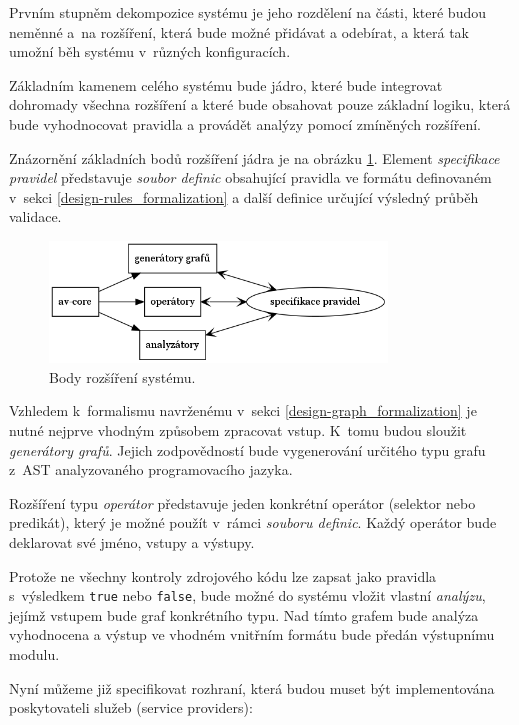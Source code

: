 Prvním stupněm dekompozice systému je jeho rozdělení na části, které budou neměnné a~na rozšíření, která bude možné přidávat a odebírat, a která tak umožní běh systému v~různých konfiguracích.

Základním kamenem celého systému bude jádro, které bude integrovat dohromady všechna rozšíření a které bude obsahovat pouze základní logiku, která bude vyhodnocovat pravidla a provádět analýzy pomocí zmíněných rozšíření.

Znázornění základních bodů rozšíření jádra je na obrázku \ref{design-system_extensions}. Element \emph{specifikace pravidel} představuje \emph{soubor definic} obsahující pravidla ve formátu definovaném v~sekci \ref{design-rules_formalization} a další definice určující výsledný průběh validace.

\begin{figure}[h!]
  \centering
  \includegraphics[width=0.8\textwidth]{./graphs/system_extensions.png}
  \caption{Body rozšíření systému.\label{design-system_extensions}}
\end{figure}

Vzhledem k~formalismu navrženému v~sekci \ref{design-graph_formalization} je nutné nejprve vhodným způsobem zpracovat vstup. K~tomu budou sloužit \emph{generátory grafů}. Jejich zodpovědností bude vygenerování určitého typu grafu z~AST analyzovaného programovacího jazyka.

Rozšíření typu \emph{operátor} představuje jeden konkrétní operátor (selektor nebo predikát), který je možné použít v~rámci \emph{souboru definic}. Každý operátor bude deklarovat své jméno, vstupy a výstupy.

Protože ne všechny kontroly zdrojového kódu lze zapsat jako pravidla s~výsledkem \verb+true+ nebo \verb+false+, bude možné do systému vložit vlastní \emph{analýzu}, jejímž vstupem bude graf konkrétního typu. Nad tímto grafem bude analýza vyhodnocena a výstup ve vhodném vnitřním formátu bude předán výstupnímu modulu.

Nyní můžeme již specifikovat rozhraní, která budou muset být implementována poskytovateli služeb (service providers):

